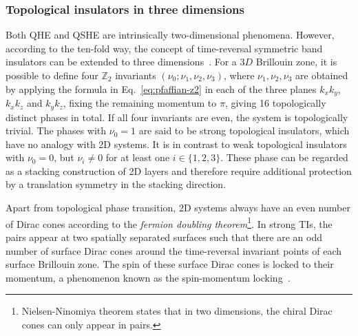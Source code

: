 \subsubsection{Topological insulators in three dimensions}
Both QHE and QSHE are intrinsically two-dimensional phenomena. However, according to the ten-fold way, the concept of time-reversal symmetric band insulators can be extended to three dimensions~\cite{PhysRevB.75.121306, PhysRevLett.98.106803}. For a $3D$ Brillouin zone, it is possible to define four $\mathbb{Z}_2$ invariants $(\nu_0; \nu_1, \nu_2, \nu_3)$, where $\nu_1, \nu_2, \nu_3$ are obtained by applying the formula in Eq.~\eqref{eq:pfaffian-z2} in each of the three planes $k_x k_y$, $k_x k_z$ and $k_y k_z$, fixing the remaining momentum to $\pi$, giving 16 topologically distinct phases in total. If all four invariants are even, the system is topologically trivial. The phases with $\nu_0 =1$ are said to be strong topological insulators, which have no analogy with 2D systems. It is in contrast to weak topological insulators with $\nu_0 =0$, but $\nu_i \neq 0$ for at least one $i \in \lbrace 1, 2, 3 \rbrace$. These phase can be regarded as a stacking construction of 2D layers and therefore require additional protection by a translation symmetry in the stacking direction. 

Apart from topological phase transition, 2D systems always have an even number of Dirac cones according to the \emph{fermion doubling theorem}\footnote{Nielsen-Ninomiya theorem states that in two dimensions, the chiral Dirac cones can only appear in pairs.}. In strong TIs, the pairs appear at two spatially separated surfaces such that there are an odd number of surface Dirac cones around the time-reversal invariant points of each surface Brillouin zone. The spin of these surface Dirac cones is locked to their momentum, a phenomenon known as the spin-momentum locking~\cite{RevModPhys.82.3045}.

